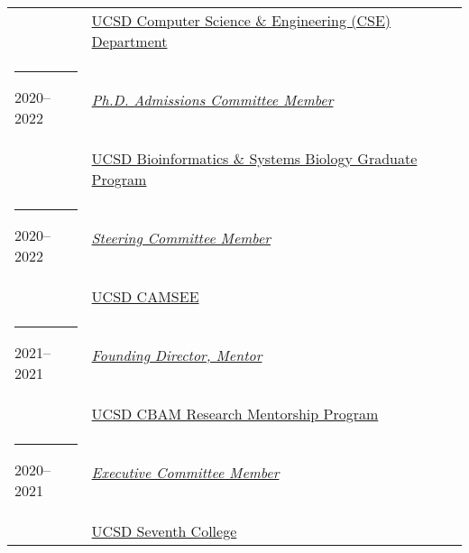 \documentclass[margin,line]{res}
\begin{document}
\begin{resume}
\begin{longtable}{@{}p{0.7in}p{4in}}
\hspace*{-4mm} & \hspace{4mm} \href{http://cse.ucsd.edu}{UCSD Computer Science \& Engineering (CSE) Department}\\
\hspace*{-4mm} \rule{-1mm}{5mm} 2020--2022 & \href{https://bioinformatics.ucsd.edu/}{\textit{Ph.D. Admissions Committee Member}}\\*
\hspace*{-4mm} & \hspace{4mm} \href{https://bioinformatics.ucsd.edu/}{UCSD Bioinformatics \& Systems Biology Graduate Program}\\
\hspace*{-4mm} \rule{-1mm}{5mm} 2020--2022 & \href{https://camsee.ucsd.edu/}{\textit{Steering Committee Member}}\\*
\hspace*{-4mm} & \hspace{4mm} \href{https://camsee.ucsd.edu/}{UCSD CAMSEE}\\
\hspace*{-4mm} \rule{-1mm}{5mm} 2021--2021 & \href{https://sites.google.com/eng.ucsd.edu/cbam}{\textit{Founding Director, Mentor}}\\*
\hspace*{-4mm} & \hspace{4mm} \href{https://sites.google.com/eng.ucsd.edu/cbam}{UCSD CBAM Research Mentorship Program}\\
\hspace*{-4mm} \rule{-1mm}{5mm} 2020--2021 & \href{https://seventh.ucsd.edu/about/faculty/index.html#Executive-Committee}{\textit{Executive Committee Member}}\\*
\hspace*{-4mm} & \hspace{4mm} \href{https://seventh.ucsd.edu/}{UCSD Seventh College}\\
\end{longtable}


\end{resume}
\end{document}

